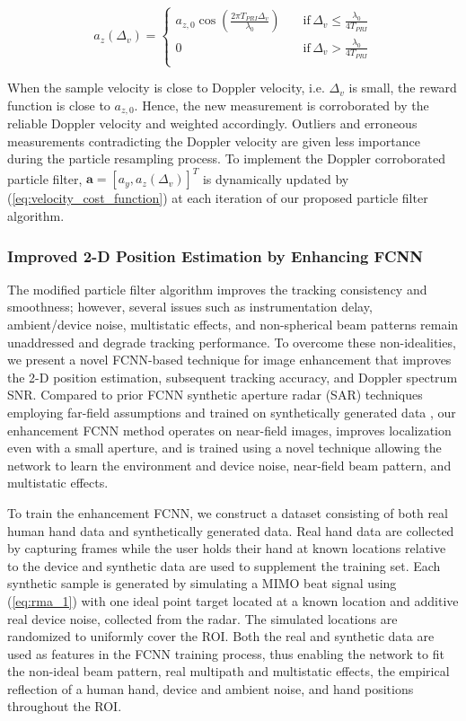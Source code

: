 \documentclass[10pt,journal,final]{IEEEtran}
\begin{document}
\begin{equation}
	\label{eq:velocity_cost_function}
	a_z (\Delta_v)=\begin{cases}
		a_{z,0} \cos \left(\frac{2\pi T_{PRI} \Delta_v}{\lambda_0}\right) \quad &\text{if} \, \Delta_v \leq \frac{\lambda_0}{4T_{PRI}} \\
		0 \quad &\text{if} \, \Delta_v > \frac{\lambda_0}{4T_{PRI}} \\
	\end{cases}
\end{equation}

When the sample velocity is close to Doppler velocity, i.e. $\Delta_v$ is small, the reward function is close to $a_{z,0}$. 
Hence, the new measurement is corroborated by the reliable Doppler velocity and weighted accordingly. 
Outliers and erroneous measurements contradicting the Doppler velocity are given less importance during the particle resampling process. 
To implement the Doppler corroborated particle filter, $\mathbf{a} = [a_y, a_z(\Delta_v)]^T$  is dynamically updated by (\ref{eq:velocity_cost_function}) at each iteration of our proposed particle filter algorithm.

\subsubsection{Improved 2-D Position Estimation by Enhancing FCNN}
\label{subsubsec:improved_2d_position_esitmation_by_FCNN}
The modified particle filter algorithm improves the tracking consistency and smoothness; however, several issues such as instrumentation delay, ambient/device noise, multistatic effects, and non-spherical beam patterns remain unaddressed and degrade tracking performance. 
To overcome these non-idealities, we present a novel FCNN-based technique for image enhancement that improves the 2-D position estimation, subsequent tracking accuracy, and Doppler spectrum SNR. 
Compared to prior FCNN synthetic aperture radar (SAR) techniques employing far-field assumptions and trained on synthetically generated data \cite{gao2018enhanced}, our enhancement FCNN method operates on near-field images, improves localization even with a small aperture, and is trained using a novel technique allowing the network to learn the environment and device noise, near-field beam pattern, and multistatic effects.

To train the enhancement FCNN, we construct a dataset consisting of both real human hand data and synthetically generated data.
Real hand data are collected by capturing frames while the user holds their hand at known locations relative to the device and synthetic data are used to supplement the training set. 
Each synthetic sample is generated by simulating a MIMO beat signal using (\ref{eq:rma_1}) with one ideal point target located at a known location and additive real device noise, collected from the radar. 
The simulated locations are randomized to uniformly cover the ROI.
Both the real and synthetic data are used as features in the FCNN training process, thus enabling the network to fit the non-ideal beam pattern, real multipath and multistatic effects, the empirical reflection of a human hand, device and ambient noise, and hand positions throughout the ROI. 
\end{document}
